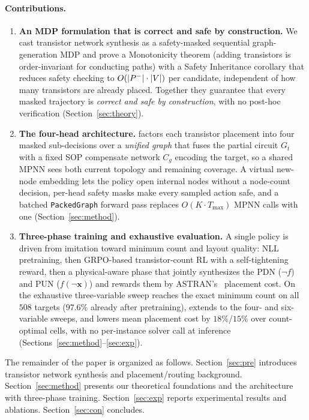 \paragraph{Contributions.}
\begin{enumerate}[leftmargin=*, topsep=2pt, itemsep=3pt]

  \item \textbf{An MDP formulation that is correct and safe by construction.}
        We cast transistor network synthesis as a safety-masked sequential
        graph-generation MDP and prove a Monotonicity theorem (adding
        transistors is order-invariant for conducting paths) with a Safety
        Inheritance corollary that reduces safety checking to
        $O(|P^{-}|\cdot|V|)$ per candidate, independent of how many transistors
        are already placed.  Together they guarantee that every masked
        trajectory is \emph{correct and safe by construction}, with no post-hoc
        verification (Section~\ref{sec:theory}).

  \item \textbf{The four-head \SGPN{} architecture.}
        \method{} factors each transistor placement into four masked
        sub-decisions over a \emph{unified graph} that fuses the partial circuit
        $G_t$ with a fixed SOP compensate network $C_g$ encoding the target, so
        a shared MPNN sees both current topology and remaining coverage.  A
        virtual new-node embedding lets the policy open internal nodes without a
        node-count decision, per-head safety masks make every sampled action
        safe, and a batched \texttt{PackedGraph} forward pass replaces
        $O(K\cdot T_{\max})$ MPNN calls with one (Section~\ref{sec:method}).

  \item \textbf{Three-phase training and exhaustive evaluation.}
        A single policy is driven from imitation toward minimum count and
        layout quality: NLL pretraining, then GRPO-based transistor-count RL
        with a self-tightening reward, then a physical-aware phase that jointly
        synthesizes the PDN ($\lnot f$) and PUN ($f(\lnot\mathbf{x})$) and
        rewards them by ASTRAN's~\cite{astran} placement cost.  On the
        exhaustive three-variable sweep \method{} reaches the exact minimum
        count on all $508$ targets ($97.6\%$ already after pretraining), extends
        to the four- and six-variable sweeps, and lowers mean placement cost by
        $18\%$/$15\%$ over count-optimal cells, with no per-instance solver
        call at inference (Sections~\ref{sec:method}--\ref{sec:exp}).

\end{enumerate}

The remainder of the paper is organized as follows.
Section~\ref{sec:pre} introduces transistor network synthesis and
placement/routing background.
Section~\ref{sec:method} presents our theoretical foundations and the
\method{} architecture with three-phase training.
Section~\ref{sec:exp} reports experimental results and ablations.
Section~\ref{sec:con} concludes.
